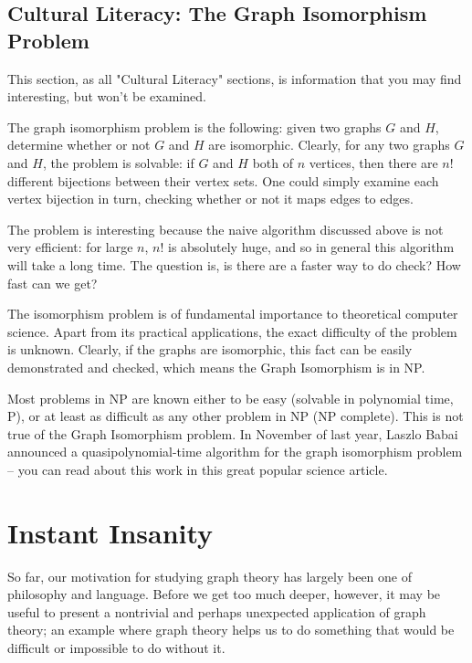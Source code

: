 \documentclass[10pt,]{book}
\theoremstyle{plain}
\theoremstyle{definition}
\theoremstyle{definition}
\theoremstyle{definition}
\theoremstyle{definition}
\numberwithin{equation}{section}
\begin{document}
\subsection[{Cultural Literacy: The Graph Isomorphism Problem}]{Cultural Literacy: The Graph Isomorphism Problem}\label{subsection-9}
\hypertarget{p-49}{}%
This section, as all "Cultural Literacy" sections, is information that you may find interesting, but won't be examined.%
\par
\hypertarget{p-50}{}%
The graph isomorphism problem is the following: given two graphs \(G\) and \(H\), determine whether or not \(G\) and \(H\) are isomorphic. Clearly, for any two graphs \(G\) and \(H\), the problem is solvable: if \(G\) and \(H\) both of \(n\) vertices, then there are \(n!\) different bijections between their vertex sets.  One could simply examine each vertex bijection in turn, checking whether or not it maps edges to edges.%
\par
\hypertarget{p-51}{}%
The problem is interesting because the naive algorithm discussed above is not very efficient: for large \(n\), \(n!\) is absolutely huge, and so in general this algorithm will take a long time.  The question is, is there are a faster way to do check? How fast can we get?%
\par
\hypertarget{p-52}{}%
The isomorphism problem is of fundamental importance to theoretical computer science. Apart from its practical applications, the exact difficulty of the problem is unknown. Clearly, if the graphs are isomorphic, this fact can be easily demonstrated and checked, which means the Graph Isomorphism is in NP.%
\par
\hypertarget{p-53}{}%
Most problems in NP are known either to be easy (solvable in polynomial time, P), or at least as difficult as any other problem in NP (NP complete). This is not true of the Graph Isomorphism problem. In November of last year, Laszlo Babai announced a quasipolynomial-time algorithm for the graph isomorphism problem – you can read about this work in this great popular science article.%
\typeout{************************************************}
\typeout{************************************************}
\section[{Instant Insanity}]{Instant Insanity}\label{s_intro_instantinsanity}
\hypertarget{p-54}{}%
So far, our motivation for studying graph theory has largely been one of philosophy and language.  Before we get too much deeper, however, it may be useful to present a nontrivial and perhaps unexpected application of graph theory; an example where graph theory helps us to do something that would be difficult or impossible to do without it.%
\typeout{************************************************}
\typeout{************************************************}
\end{document}
